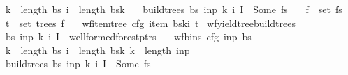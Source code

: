 \begin{isabellebody}
\ \ \ {\isachardoublequoteopen}k\ {\isacharless}{\kern0pt}\ length\ bs{\isachardoublequoteclose}\ {\isachardoublequoteopen}i\ {\isacharless}{\kern0pt}\ length\ {\isacharparenleft}{\kern0pt}bs{\isacharbang}{\kern0pt}k{\isacharparenright}{\kern0pt}{\isachardoublequoteclose}\isanewline
\ \ \ {\isachardoublequoteopen}build{\isacharunderscore}{\kern0pt}trees{\isacharprime}{\kern0pt}\ bs\ inp\ k\ i\ I\ {\isacharequal}{\kern0pt}\ Some\ fs{\isachardoublequoteclose}\isanewline
\ \ \ {\isachardoublequoteopen}f\ {\isasymin}\ set\ fs{\isachardoublequoteclose}\isanewline
\ \ \ {\isachardoublequoteopen}t\ {\isasymin}\ set\ {\isacharparenleft}{\kern0pt}trees\ f{\isacharparenright}{\kern0pt}{\isachardoublequoteclose}\isanewline
\ \ \ {\isachardoublequoteopen}wf{\isacharunderscore}{\kern0pt}item{\isacharunderscore}{\kern0pt}tree\ cfg\ {\isacharparenleft}{\kern0pt}item\ {\isacharparenleft}{\kern0pt}bs{\isacharbang}{\kern0pt}k{\isacharbang}{\kern0pt}i{\isacharparenright}{\kern0pt}{\isacharparenright}{\kern0pt}\ t{\isachardoublequoteclose}%
\isadelimproof
%
\endisadelimproof
%
\isatagproof
%
\endisatagproof
{\isafoldproof}%
%
\isadelimproof
\isanewline
%
\endisadelimproof
{}\isamarkupfalse%
\ wf{\isacharunderscore}{\kern0pt}yield{\isacharunderscore}{\kern0pt}tree{\isacharunderscore}{\kern0pt}build{\isacharunderscore}{\kern0pt}trees{\isacharprime}{\kern0pt}{\isacharcolon}{\kern0pt}\isanewline
\ \ \ {\isachardoublequoteopen}{\isacharparenleft}{\kern0pt}bs{\isacharcomma}{\kern0pt}\ inp{\isacharcomma}{\kern0pt}\ k{\isacharcomma}{\kern0pt}\ i{\isacharcomma}{\kern0pt}\ I{\isacharparenright}{\kern0pt}\ {\isasymin}\ wellformed{\isacharunderscore}{\kern0pt}forest{\isacharunderscore}{\kern0pt}ptrs{\isachardoublequoteclose}\isanewline
\ \ \ {\isachardoublequoteopen}wf{\isacharunderscore}{\kern0pt}bins\ cfg\ inp\ bs{\isachardoublequoteclose}\isanewline
\ \ \ {\isachardoublequoteopen}k\ {\isacharless}{\kern0pt}\ length\ bs{\isachardoublequoteclose}\ {\isachardoublequoteopen}i\ {\isacharless}{\kern0pt}\ length\ {\isacharparenleft}{\kern0pt}bs{\isacharbang}{\kern0pt}k{\isacharparenright}{\kern0pt}{\isachardoublequoteclose}\ {\isachardoublequoteopen}k\ {\isasymle}\ length\ inp{\isachardoublequoteclose}\isanewline
\ \ \ {\isachardoublequoteopen}build{\isacharunderscore}{\kern0pt}trees{\isacharprime}{\kern0pt}\ bs\ inp\ k\ i\ I\ {\isacharequal}{\kern0pt}\ Some\ fs{\isachardoublequoteclose}\isanewline

\end{isabellebody}
